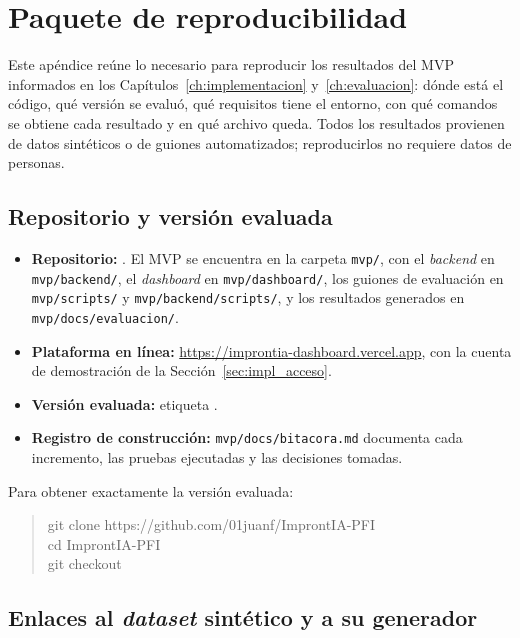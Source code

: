 \chapter{Paquete de reproducibilidad}
\label{apx:reproducibilidad}
\begingroup\sloppy
\let\ApxOrigUnderscore\_
\renewcommand{\_}{\ApxOrigUnderscore\allowbreak}

Este apéndice reúne lo necesario para reproducir los resultados del MVP informados en los Capítulos~\ref{ch:implementacion} y~\ref{ch:evaluacion}: dónde está el código, qué versión se evaluó, qué requisitos tiene el entorno, con qué comandos se obtiene cada resultado y en qué archivo queda. Todos los resultados provienen de datos sintéticos o de guiones automatizados; reproducirlos no requiere datos de personas.

\section{Repositorio y versión evaluada}

\begin{itemize}
    \item \textbf{Repositorio:} \repomvp. El MVP se encuentra en la carpeta \texttt{mvp/}, con el \textit{backend} en \texttt{mvp/backend/}, el \textit{dashboard} en \texttt{mvp/dashboard/}, los guiones de evaluación en \texttt{mvp/scripts/} y \texttt{mvp/backend/scripts/}, y los resultados generados en \texttt{mvp/docs/evaluacion/}.
    \item \textbf{Plataforma en línea:} \url{https://improntia-dashboard.vercel.app}, con la cuenta de demostración de la Sección~\ref{sec:impl_acceso}.
    \item \textbf{Versión evaluada:} etiqueta \texttt{\versionmvp}.
    \item \textbf{Registro de construcción:} \texttt{mvp/docs/bitacora.md} documenta cada incremento, las pruebas ejecutadas y las decisiones tomadas.
\end{itemize}

Para obtener exactamente la versión evaluada:

\begin{quote}\footnotesize\ttfamily
git clone https://github.com/01juanf/ImprontIA-PFI\\
cd ImprontIA-PFI\\
git checkout \versionmvp
\end{quote}

\section{Enlaces al \textit{dataset} sintético y a su generador}
\label{sec:repro_enlaces}

